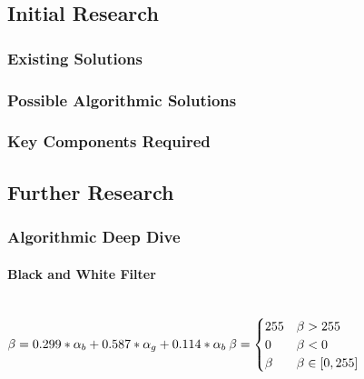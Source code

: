 \begin{flushleft}
        \bk

        \subsection{Initial Research} 
            \subsubsection{Existing Solutions}

            \subsubsection{Possible Algorithmic Solutions}

            \subsubsection{Key Components Required}

        \subsection{Further Research}
            \subsubsection{Algorithmic Deep Dive}

            \paragraph{Black and White Filter}
            \mbox{} \\
            
            \bk
            \begin{math}
                {\beta = 0.299 * \alpha_{b} + 0.587 * \alpha_{g} + 0.114 * \alpha_{b}} \\

                \:
                
                \beta = \begin{cases}
                    255 & \beta > 255 \\
                    0 & \beta < 0 \\
                    \beta & \beta \in [0, 255]
                \end{cases}
            
            \end{math}
            \bk


\end{flushleft}
